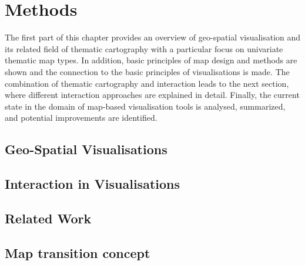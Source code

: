 \section{Methods}
\label{s:methods}
The first part of this chapter provides an overview of geo-spatial visualisation and its related field of thematic cartography with a particular focus on univariate thematic map types. In addition, basic principles of map design and methods are shown and the connection to the basic principles of visualisations is made.
The combination of thematic cartography and interaction leads to the next section, where different interaction approaches are explained in detail. Finally, the current state in the domain of map-based visualisation tools is analysed, summarized, and potential improvements are identified.

\subsection{Geo-Spatial Visualisations}
\label{s:cartography}


% 

\subsection{Interaction in Visualisations}
\label{s:interaction}


\subsection{Related Work}


\subsection{Map transition concept}
\label{s:theoretical-contrib}
